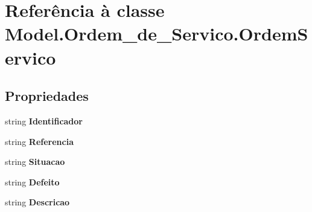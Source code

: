 \hypertarget{class_model_1_1_ordem__de___servico_1_1_ordem_servico}{}\section{Referência à classe Model.\+Ordem\+\_\+de\+\_\+\+Servico.\+Ordem\+Servico}
\label{class_model_1_1_ordem__de___servico_1_1_ordem_servico}
\subsection*{Propriedades}
\begin{DoxyCompactItemize}
\item 
\hypertarget{class_model_1_1_ordem__de___servico_1_1_ordem_servico_ab50cb47945c4c86c9b42aba5aece7000}{}string {\bfseries Identificador}\label{class_model_1_1_ordem__de___servico_1_1_ordem_servico_ab50cb47945c4c86c9b42aba5aece7000}

\item 
\hypertarget{class_model_1_1_ordem__de___servico_1_1_ordem_servico_af054814a04f8a8d3a84865844837ffc9}{}string {\bfseries Referencia}\label{class_model_1_1_ordem__de___servico_1_1_ordem_servico_af054814a04f8a8d3a84865844837ffc9}

\item 
\hypertarget{class_model_1_1_ordem__de___servico_1_1_ordem_servico_a3d0c97e6fe6180fa3d04e52352c38a75}{}string {\bfseries Situacao}\label{class_model_1_1_ordem__de___servico_1_1_ordem_servico_a3d0c97e6fe6180fa3d04e52352c38a75}

\item 
\hypertarget{class_model_1_1_ordem__de___servico_1_1_ordem_servico_a29fafb8a6aee0c8cdc64f4e1a26398f9}{}string {\bfseries Defeito}\label{class_model_1_1_ordem__de___servico_1_1_ordem_servico_a29fafb8a6aee0c8cdc64f4e1a26398f9}

\item 
\hypertarget{class_model_1_1_ordem__de___servico_1_1_ordem_servico_a0d34b506782f579945bad83a4c61e656}{}string {\bfseries Descricao}\label{class_model_1_1_ordem__de___servico_1_1_ordem_servico_a0d34b506782f579945bad83a4c61e656}


\end{DoxyCompactItemize}
